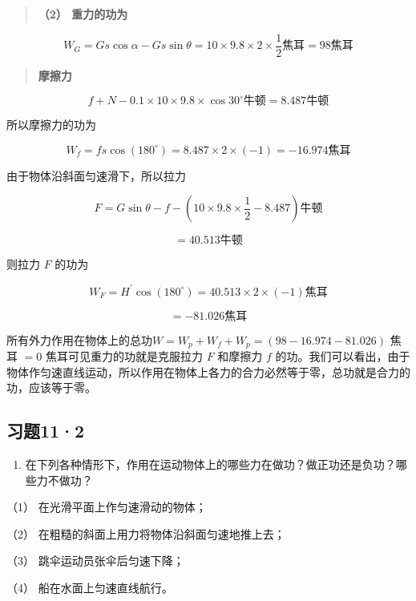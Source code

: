 \begin{quote}
\textbf{（2） 重力的功为}
\end{quote}

\[
W _ {G} = G s \cos \alpha - G s \sin \theta = 10 \times 9.8 \times 2 \times \frac {1}{2} \text{焦耳} = 98 \text{焦耳}
\]

\begin{quote}
\textbf{摩擦力}
\end{quote}

\[
f + N - 0.1 \times 10 \times 9.8 \times \cos 30 ^ {\circ} \text{牛顿} = 8.487 \text{牛顿}
\]

所以摩擦力的功为

\[
W _ {f} = f s \cos (180 ^ {\circ}) = 8.487 \times 2 \times (- 1) = - 16.974 \text{焦耳}
\]

由于物体沿斜面匀速滑下，所以拉力

\[
F = G \sin \theta - f - \left(10 \times 9.8 \times \frac {1}{2} - 8.487\right) \text{牛顿}
\]

\[
= 40.513 \text{牛顿}
\]

则拉力 \(F\) 的功为

\[
W _ {F} = H ^ {\prime} \cos (180 ^ {\circ}) = 40.513 \times 2 \times (- 1) \text{焦耳}
\]

\[
= - 81.026 \text{焦耳}
\]

所有外力作用在物体上的总功\(W = W_{p} + W_{f} + W_{p} = (98 - 16.974 - 81.026)\)
焦耳 \(= 0\) 焦耳可见重力的功就是克服拉力 \(F\) 和摩擦力 \(f\)
的功。我们可以看出，由于物体作匀速直线运动，所以作用在物体上各力的合力必然等于零，总功就是合力的功，应该等于零。

\subsection{习题11·2}\label{ux4e60ux9898112}

\begin{enumerate}
\def\labelenumi{\arabic{enumi}.}
\tightlist
\item
  在下列各种情形下，作用在运动物体上的哪些力在做功？做正功还是负功？哪些力不做功？
\end{enumerate}

（1） 在光滑平面上作匀速滑动的物体；

（2） 在粗糙的斜面上用力将物体沿斜面匀速地推上去；

（3） 跳伞运动员张伞后匀速下降；

（4） 船在水面上匀速直线航行。

